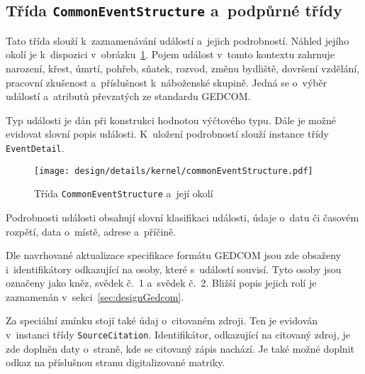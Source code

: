 		\subsection*{Třída \texttt{CommonEventStructure} a~podpůrné třídy}
		Tato třída slouží k~zaznamenávání událostí a~jejich podrobností. Náhled jejího okolí je k~dispozici v~obrázku~\ref{fig:designDetailCommonEventStructure}. Pojem událost v~tomto kontextu zahrnuje narození, křest, úmrtí, pohřeb, sňatek, rozvod, změnu bydliště, dovršení vzdělání, pracovní zkušenost a~příslušnost k~náboženské skupině. Jedná se o~výběr událostí a~atributů převzatých ze standardu GEDCOM. \par
		Typ události je dán při konstrukci hodnotou výčtového typu. Dále je možné evidovat slovní popis události. K~uložení podrobností slouží instance třídy \texttt{EventDetail}.\par
		\begin{figure}[h]
			\centering
			\texttt{[image: design/details/kernel/commonEventStructure.pdf]}
			\caption{Třída \texttt{CommonEventStructure} a~její okolí}
			\label{fig:designDetailCommonEventStructure}
		\end{figure}
		Podrobnosti události obsahují slovní klasifikaci události, údaje o~datu či časovém rozpětí, data o~místě, adrese a~příčině. \par
		Dle navrhované aktualizace specifikace formátu GEDCOM jsou zde obsaženy i~identifikátory odkazující na osoby, které s~událostí souvisí. Tyto osoby jsou označeny jako kněz, svědek č.~1 a~svědek č.~2. Bližší popis jejich rolí je zaznamenán v~sekci~\ref{sec:designGedcom}.\par
		Za speciální zmínku stojí také údaj o~citovaném zdroji. Ten je evidován v~instanci třídy \texttt{SourceCitation}. Identifikátor, odkazující na citovaný zdroj, je zde doplněn daty o~straně, kde se citovaný zápis nachází. Je také možné doplnit odkaz na příslušnou stranu digitalizované matriky. \par
		
